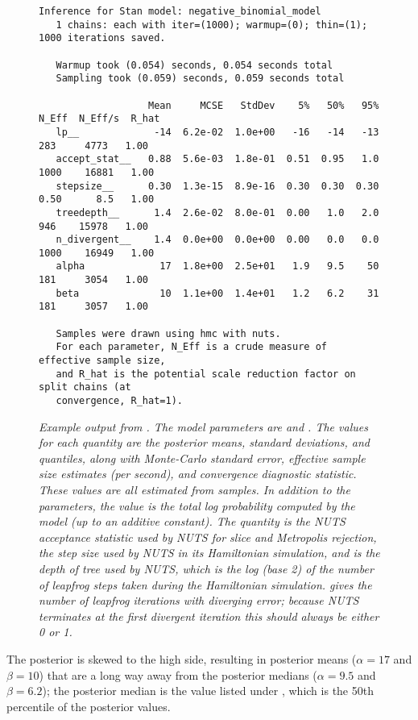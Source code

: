 \begin{figure}
\begin{Verbatim}[fontsize=\footnotesize]
   Inference for Stan model: negative_binomial_model
   1 chains: each with iter=(1000); warmup=(0); thin=(1); 1000 iterations saved.

   Warmup took (0.054) seconds, 0.054 seconds total
   Sampling took (0.059) seconds, 0.059 seconds total

                   Mean     MCSE   StdDev    5%   50%   95%  N_Eff  N_Eff/s  R_hat
   lp__             -14  6.2e-02  1.0e+00   -16   -14   -13    283     4773   1.00
   accept_stat__   0.88  5.6e-03  1.8e-01  0.51  0.95   1.0   1000    16881   1.00
   stepsize__      0.30  1.3e-15  8.9e-16  0.30  0.30  0.30   0.50      8.5   1.00
   treedepth__      1.4  2.6e-02  8.0e-01  0.00   1.0   2.0    946    15978   1.00
   n_divergent__    1.4  0.0e+00  0.0e+00  0.00   0.0   0.0   1000    16949   1.00
   alpha             17  1.8e+00  2.5e+01   1.9   9.5    50    181     3054   1.00
   beta              10  1.1e+00  1.4e+01   1.2   6.2    31    181     3057   1.00

   Samples were drawn using hmc with nuts.
   For each parameter, N_Eff is a crude measure of effective sample size,
   and R_hat is the potential scale reduction factor on split chains (at 
   convergence, R_hat=1).
\end{Verbatim}
\vspace*{-6pt}
\caption{\small\it Example output from .  The model
  parameters are  and .  The values for each
  quantity are the posterior means, standard deviations, and
  quantiles, along with Monte-Carlo standard error, effective sample
  size estimates (per second), and convergence diagnostic statistic.
  These values are all estimated from samples. In addition to the
  parameters, the value  is the total log probability
  computed by the model (up to an additive constant).  The quantity
   is the NUTS acceptance statistic used by
  NUTS for slice and Metropolis rejection,  the
  step size used by NUTS in its Hamiltonian simulation, and
   is the depth of tree used by NUTS, which is the
  log (base 2) of the number of leapfrog steps taken during the
  Hamiltonian simulation.   gives the number
  of leapfrog iterations with diverging error; because NUTS terminates
  at the first divergent iteration this should always be either 0 or 1.}
\label{bin-print-eg.figure}
\end{figure}
%
The posterior is skewed to the high side, resulting in posterior means
($\alpha=17$ and $\beta=10$) that are a long way away from the posterior
medians ($\alpha=9.5$ and $\beta=6.2$);  the posterior median is the
value listed under , which is the 50th percentile of the
posterior values.

